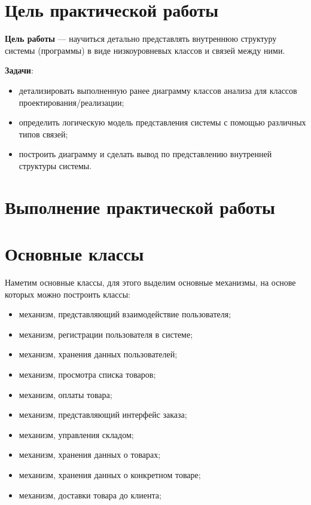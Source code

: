 \graphicspath{{./fourth/img/}} %

\section*{\LARGE Цель практической работы}

\textbf{Цель работы} --- научиться детально представлять внутреннюю структуру
системы (программы) в виде низкоуровневых классов и связей между ними.\par
\textbf{Задачи}:
\begin{itemize}
	\item детализировать выполненную ранее диаграмму классов анализа для
		классов проектирования/реализации;
	\item определить логическую модель представления системы с помощью
		различных типов связей;
	\item построить диаграмму и сделать вывод по представлению
		внутренней структуры системы.
\end{itemize}

\clearpage

\section*{\LARGE Выполнение практической работы}
\section{Основные классы}
Наметим основные классы, для этого выделим основные
механизмы, на основе которых можно построить классы:

\begin{itemize}
	\item механизм, представляющий взаимодействие пользователя;
	\item механизм, регистрации пользователя в системе;
	\item механизм, хранения данных пользователей;
	\item механизм, просмотра списка товаров;
	\item механизм, оплаты товара;
	\item механизм, представляющий интерфейс заказа;
	\item механизм, управления складом;
	\item механизм, хранения данных о товарах;
	\item механизм, хранения данных о конкретном товаре;
	\item механизм, доставки товара до клиента;
\end{itemize}

